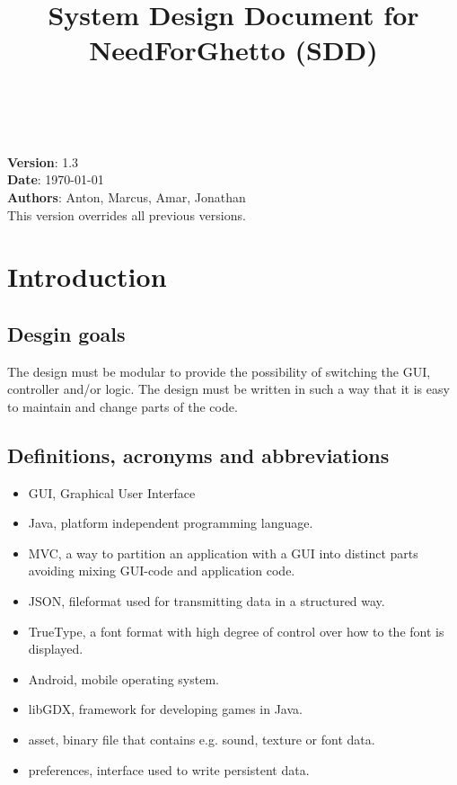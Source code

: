 \documentclass{article}
\begin{document}
\title{System Design Document for NeedForGhetto (SDD)}
\author{}
\date{}
\maketitle

\tableofcontents

\noindent
\\
\\
\textbf{Version}: 1.3 \\
\textbf{Date}: \today \\
\textbf{Authors}: Anton, Marcus, Amar, Jonathan \\
This version overrides all previous versions.

\section{Introduction}
\subsection{Desgin goals}
The design must be modular to provide the possibility of switching the GUI, controller and/or logic. The design must be written in such a way that it is easy to maintain and change parts of the code.
 
\subsection{Definitions, acronyms and abbreviations}
\begin{itemize}
  \item GUI, Graphical User Interface
  \item Java, platform independent programming language.
  \item MVC, a way to partition an application with a GUI into distinct parts avoiding
  mixing GUI-code and application code.
  \item JSON, fileformat used for transmitting data in a structured way.
  \item TrueType, a font format with high degree of control over how to the font is displayed.
  \item Android, mobile operating system. 
  \item libGDX, framework for developing games in Java.
  \item asset, binary file that contains e.g. sound, texture or font data.
  \item preferences, interface used to write persistent data.
\end{itemize}
\end{document}
